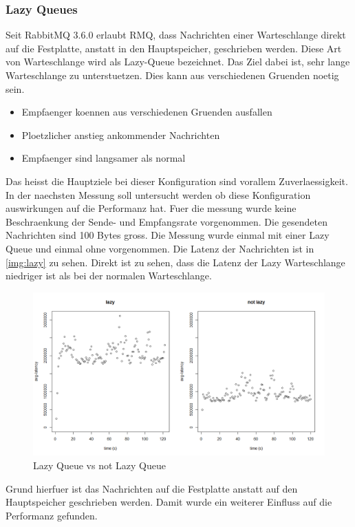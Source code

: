 \subsubsection{Lazy Queues}
Seit RabbitMQ 3.6.0 erlaubt RMQ, dass Nachrichten einer Warteschlange direkt auf die Festplatte, anstatt in den Hauptspeicher, geschrieben werden. Diese Art von Warteschlange wird als Lazy-Queue bezeichnet. Das Ziel dabei ist, sehr lange Warteschlange zu unterstuetzen. Dies kann aus verschiedenen Gruenden noetig sein. 
\begin{itemize}
    \item Empfaenger koennen aus verschiedenen Gruenden ausfallen
    \item Ploetzlicher anstieg ankommender Nachrichten
    \item Empfaenger sind langsamer als normal
\end{itemize}
Das heisst die Hauptziele bei dieser Konfiguration sind vorallem Zuverlaessigkeit. In der naechsten Messung soll untersucht werden ob diese Konfiguration auswirkungen auf die Performanz hat. Fuer die messung wurde keine Beschraenkung der Sende- und Empfangsrate vorgenommen. Die gesendeten Nachrichten sind 100 Bytes gross. Die Messung wurde einmal mit einer Lazy Queue und einmal ohne vorgenommen.
Die Latenz der Nachrichten ist in \autoref{img:lazy} zu sehen. Direkt ist zu sehen, dass die Latenz der Lazy Warteschlange niedriger ist als bei der normalen Warteschlange.
\begin{figure}
\center
  \includegraphics[width=1\textwidth]{images/lazy.png}
  \caption{Lazy Queue vs not Lazy Queue}
  \label{img:lazy}
\end{figure}
Grund hierfuer ist das Nachrichten auf die Festplatte anstatt auf den Hauptspeicher geschrieben werden. Damit wurde ein weiterer Einfluss auf die Performanz gefunden.

